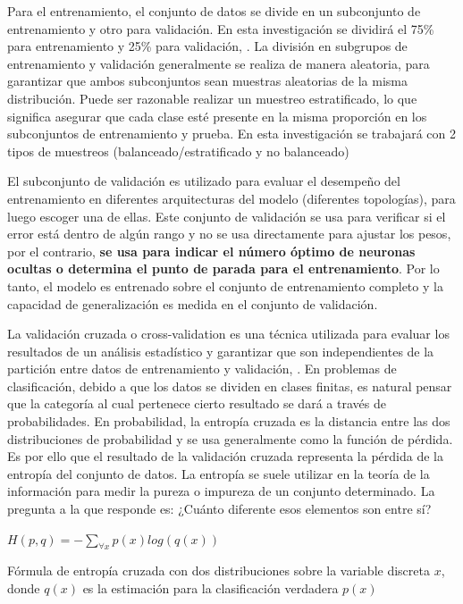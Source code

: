 		Para el entrenamiento, el conjunto de datos se divide en un subconjunto de entrenamiento y otro para validación. En esta investigación se dividirá el 75\% para entrenamiento y 25\% para validación, {\citep {Elkan12evaluatingclassifiers}}. La división en subgrupos de entrenamiento y validación generalmente se realiza de manera aleatoria, para garantizar que ambos subconjuntos sean muestras aleatorias de la misma distribución. Puede ser razonable realizar un muestreo estratificado, lo que significa asegurar que cada clase esté presente en la misma proporción en los subconjuntos de entrenamiento y prueba. En esta investigación se trabajará con 2 tipos de muestreos (balanceado/estratificado y no balanceado)

		El subconjunto de validación es utilizado para evaluar el desempeño del entrenamiento en diferentes arquitecturas del modelo (diferentes topologías), para luego escoger una de ellas. Este conjunto de validación se usa para verificar si el error está dentro de algún rango y no se usa directamente para ajustar los pesos, por el contrario, \textbf{se usa para indicar el número óptimo de neuronas ocultas o determina el punto de parada para el entrenamiento}.  Por lo tanto, el modelo es entrenado sobre el conjunto de entrenamiento completo y la capacidad de generalización es medida en el conjunto de validación. 

		La validación cruzada o cross-validation es una técnica utilizada para evaluar los resultados de un análisis estadístico y garantizar que son independientes de la partición entre datos de entrenamiento y validación, \citep{moore2001cross}. En problemas de clasificación, debido a que los datos se dividen en clases finitas, es natural pensar que la categoría al cual pertenece cierto resultado se dará a través de probabilidades. En probabilidad, la entropía cruzada es la distancia entre las dos distribuciones de probabilidad y se usa generalmente como la función de pérdida. Es por ello que el resultado de la validación cruzada representa la pérdida de la entropía del conjunto de datos. La entropía se suele utilizar en la teoría de la información para medir la pureza o impureza de un conjunto determinado. La pregunta a la que responde es: ¿Cuánto diferente esos elementos son entre sí? 

			\begingroup\makeatletter{}\check@mathfonts
			\begin{center}
			$H(p,q) = -\sum_{\forall x} p(x) log(q(x))$
			\end{center}
			\begin{center}
			{\small{Fórmula de entropía cruzada con dos distribuciones sobre la variable discreta $x$, donde $q(x)$ es la estimación para la clasificación verdadera $p(x)$}}
			\end{center}
			\endgroup		

